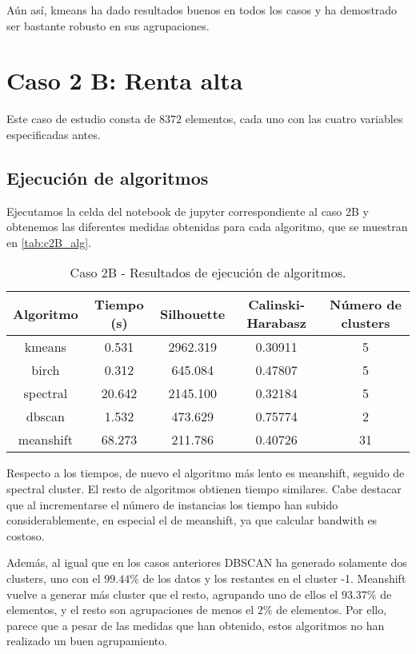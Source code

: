 Aún así, kmeans ha dado resultados buenos en todos los casos y ha demostrado ser bastante robusto en sus agrupaciones.



\section{Caso 2 B: Renta alta}

Este caso de estudio consta de $8372$ elementos, cada uno con las cuatro variables especificadas antes.

\subsection{Ejecución de algoritmos}

Ejecutamos la celda del notebook de jupyter correspondiente al caso 2B y obtenemos las diferentes medidas obtenidas para cada algoritmo, que se muestran en \eqref{tab:c2B_alg}.

\begin{table}[H]
\centering
\caption{Caso 2B - Resultados de ejecución de algoritmos.}
\label{tab:c2_alg}
\begin{tabular}{ccccc}
\toprule
 Algoritmo & Tiempo (s) & Silhouette & Calinski-Harabasz & Número de clusters \\
\midrule
kmeans & 0.531 & 2962.319 & 0.30911 & 5 \\
birch & 0.312 & 645.084 & 0.47807 & 5 \\
spectral & 20.642 & 2145.100 & 0.32184 & 5 \\
dbscan & 1.532 & 473.629 & 0.75774 & 2 \\
meanshift & 68.273 & 211.786 & 0.40726 & 31 \\
\bottomrule
\end{tabular}
\end{table}

Respecto a los tiempos, de nuevo el algoritmo más lento es meanshift, seguido de spectral cluster. El resto de algoritmos obtienen tiempo similares. Cabe destacar que al incrementarse el número de instancias los tiempo han subido considerablemente, en especial el de meanshift, ya que calcular bandwith es costoso.

Además, al igual que en los casos anteriores DBSCAN ha generado solamente dos clusters, uno con el $99.44\%$ de los datos y los restantes en el cluster -1. Meanshift vuelve a generar más cluster que el resto, agrupando uno de ellos el $93.37\%$ de elementos, y el resto son  agrupaciones de menos el $2\%$ de elementos. Por ello, parece que a pesar de las medidas que han obtenido, estos algoritmos no han realizado un buen agrupamiento.

